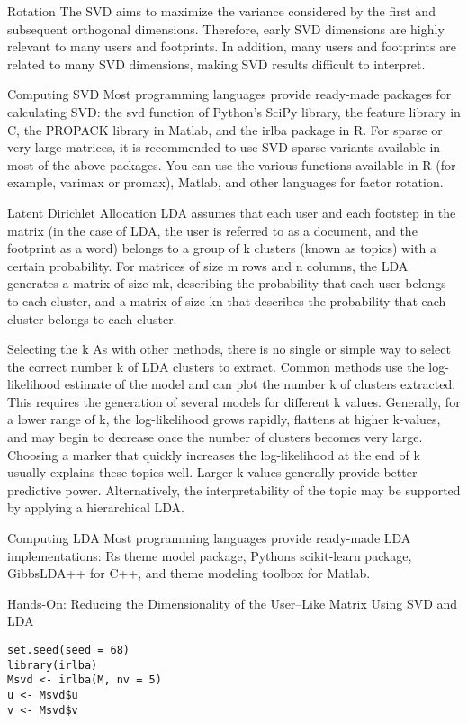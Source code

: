 Rotation
The SVD aims to maximize the variance considered by the first and 
subsequent orthogonal dimensions. Therefore, early SVD dimensions 
are highly relevant to many users and footprints. In addition, many
 users and footprints are related to many SVD dimensions, making 
SVD results difficult to interpret.

Computing SVD
Most programming languages provide ready-made packages for 
calculating SVD: the svd function of Python's SciPy library, the 
feature library in C, the PROPACK library in Matlab, and the 
irlba package in R. For sparse or very large matrices, it is 
recommended to use SVD sparse variants available in most of the 
above packages. You can use the various functions available in R 
(for example, varimax or promax), Matlab, and other languages for 
factor rotation.

Latent Dirichlet Allocation
LDA assumes that each user and each footstep in the matrix (in the
 case of LDA, the user is referred to as a document, and the 
footprint as a word) belongs to a group of k clusters (known as 
topics) with a certain probability. For matrices of size m rows and
 n columns, the LDA generates a matrix of size mk, describing the 
probability that each user belongs to each cluster, and a matrix of
 size kn that describes the probability that each cluster belongs 
to each cluster. 

Selecting the k
As with other methods, there is no single or simple way to select 
the correct number k of LDA clusters to extract. Common methods use
 the log-likelihood estimate of the model and can plot the number k
 of clusters extracted. This requires the generation of several 
models for different k values. Generally, for a lower range of k, 
the log-likelihood grows rapidly, flattens at higher k-values, and
 may begin to decrease once the number of clusters becomes very 
large. Choosing a marker that quickly increases the log-likelihood
 at the end of k usually explains these topics well. Larger 
k-values generally provide better predictive power. Alternatively,
 the interpretability of the topic may be supported by applying a 
hierarchical LDA.

Computing LDA
Most programming languages provide ready-made LDA implementations: Rs 
theme model package, Pythons scikit-learn package, 
GibbsLDA++ for C++, and theme modeling toolbox for Matlab.

Hands-On: Reducing the Dimensionality of the
User–Like Matrix Using SVD and LDA

\begin{verbatim}
set.seed(seed = 68)
library(irlba)
Msvd <- irlba(M, nv = 5)
u <- Msvd$u
v <- Msvd$v
\end{verbatim}

